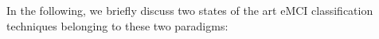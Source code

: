 \documentclass[preprint,12pt]{elsarticle}
\begin{document}
	
	In the following, we briefly discuss two states of the art eMCI classification techniques belonging to these two paradigms:
	
	
	
	
	
	
	
	
	
	
\end{document}
